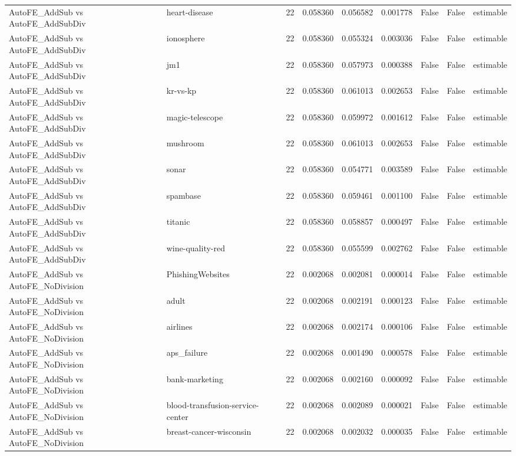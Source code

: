 \begin{table}
\begin{tabular}{llrrrrrrl}
AutoFE\_AddSub vs AutoFE\_AddSubDiv & heart-disease & 22 & 0.058360 & 0.056582 & 0.001778 & False & False & estimable \\
AutoFE\_AddSub vs AutoFE\_AddSubDiv & ionosphere & 22 & 0.058360 & 0.055324 & 0.003036 & False & False & estimable \\
AutoFE\_AddSub vs AutoFE\_AddSubDiv & jm1 & 22 & 0.058360 & 0.057973 & 0.000388 & False & False & estimable \\
AutoFE\_AddSub vs AutoFE\_AddSubDiv & kr-vs-kp & 22 & 0.058360 & 0.061013 & 0.002653 & False & False & estimable \\
AutoFE\_AddSub vs AutoFE\_AddSubDiv & magic-telescope & 22 & 0.058360 & 0.059972 & 0.001612 & False & False & estimable \\
AutoFE\_AddSub vs AutoFE\_AddSubDiv & mushroom & 22 & 0.058360 & 0.061013 & 0.002653 & False & False & estimable \\
AutoFE\_AddSub vs AutoFE\_AddSubDiv & sonar & 22 & 0.058360 & 0.054771 & 0.003589 & False & False & estimable \\
AutoFE\_AddSub vs AutoFE\_AddSubDiv & spambase & 22 & 0.058360 & 0.059461 & 0.001100 & False & False & estimable \\
AutoFE\_AddSub vs AutoFE\_AddSubDiv & titanic & 22 & 0.058360 & 0.058857 & 0.000497 & False & False & estimable \\
AutoFE\_AddSub vs AutoFE\_AddSubDiv & wine-quality-red & 22 & 0.058360 & 0.055599 & 0.002762 & False & False & estimable \\
AutoFE\_AddSub vs AutoFE\_NoDivision & PhishingWebsites & 22 & 0.002068 & 0.002081 & 0.000014 & False & False & estimable \\
AutoFE\_AddSub vs AutoFE\_NoDivision & adult & 22 & 0.002068 & 0.002191 & 0.000123 & False & False & estimable \\
AutoFE\_AddSub vs AutoFE\_NoDivision & airlines & 22 & 0.002068 & 0.002174 & 0.000106 & False & False & estimable \\
AutoFE\_AddSub vs AutoFE\_NoDivision & aps\_failure & 22 & 0.002068 & 0.001490 & 0.000578 & False & False & estimable \\
AutoFE\_AddSub vs AutoFE\_NoDivision & bank-marketing & 22 & 0.002068 & 0.002160 & 0.000092 & False & False & estimable \\
AutoFE\_AddSub vs AutoFE\_NoDivision & blood-transfusion-service-center & 22 & 0.002068 & 0.002089 & 0.000021 & False & False & estimable \\
AutoFE\_AddSub vs AutoFE\_NoDivision & breast-cancer-wisconsin & 22 & 0.002068 & 0.002032 & 0.000035 & False & False & estimable \\

\end{tabular}
\end{table}
